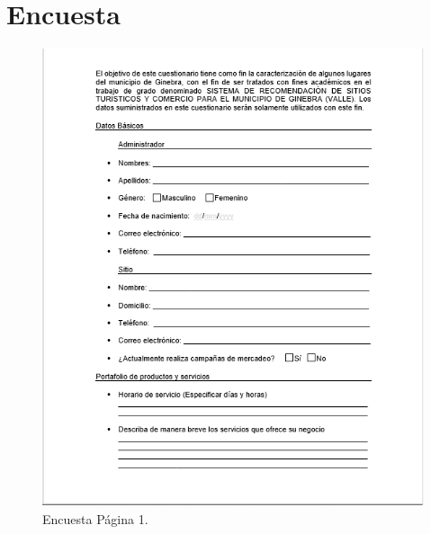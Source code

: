 \documentclass[12pt,letterpaper,openany]{book}
\begin{document}
\chapter{Encuesta}\label{aped.C}
\begin{figure}[H]
\begin{center}
\includegraphics[width=12cm]{./imagenes/Encuesta1}
\caption{Encuesta Página 1.}
\end{center}
\end{figure}
\end{document}

